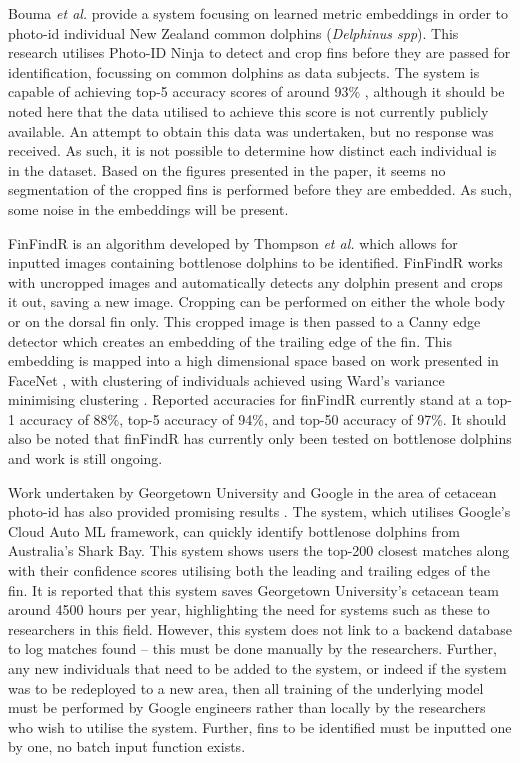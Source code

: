 Bouma \textit{et al.} provide a system focusing on learned metric embeddings in order to photo-id individual New Zealand common dolphins (\textit{Delphinus spp}). This research utilises Photo-ID Ninja to detect and crop fins before they are passed for identification, focussing on common dolphins as data subjects. The system is capable of achieving top-5 accuracy scores of around 93\% \cite{bouma_individual_2018}, although it should be noted here that the data utilised to achieve this score is not currently publicly available. An attempt to obtain this data was undertaken, but no response was received. As such, it is not possible to determine how distinct each individual is in the dataset. Based on the figures presented in the paper, it seems no segmentation of the cropped fins is performed before they are embedded. As such, some noise in the embeddings will be present. 

FinFindR is an algorithm developed by Thompson \textit{et al.} \cite{thompson_finfindr_2022} which allows for inputted images containing bottlenose dolphins to be identified. FinFindR works with uncropped images and automatically detects any dolphin present and crops it out, saving a new image. Cropping can be performed on either the whole body or on the dorsal fin only. This cropped image is then passed to a Canny edge detector which creates an embedding of the trailing edge of the fin. This embedding is mapped into a high dimensional space based on work presented in FaceNet \cite{schroff_facenet_2015}, with clustering of individuals achieved using Ward's variance minimising clustering \cite{ward_hierarchical_1963}. Reported accuracies for finFindR currently stand at a top-1 accuracy of 88\%, top-5 accuracy of 94\%, and top-50 accuracy of 97\%. It should also be noted that finFindR has currently only been tested on bottlenose dolphins and work is still ongoing.

Work undertaken by Georgetown University and Google in the area of cetacean photo-id has also provided promising results \cite{georgetown_university_is_2018}. The system, which utilises Google's Cloud Auto ML framework, can quickly identify bottlenose dolphins from Australia's Shark Bay. This system shows users the top-200 closest matches along with their confidence scores utilising both the leading and trailing edges of the fin. It is reported that this system saves Georgetown University's cetacean team around 4500 hours per year, highlighting the need for systems such as these to researchers in this field. However, this system does not link to a backend database to log matches found -- this must be done manually by the researchers. Further, any new individuals that need to be added to the system, or indeed if the system was to be redeployed to a new area, then all training of the underlying model must be performed by Google engineers rather than locally by the researchers who wish to utilise the system. Further, fins to be identified must be inputted one by one, no batch input function exists.  

